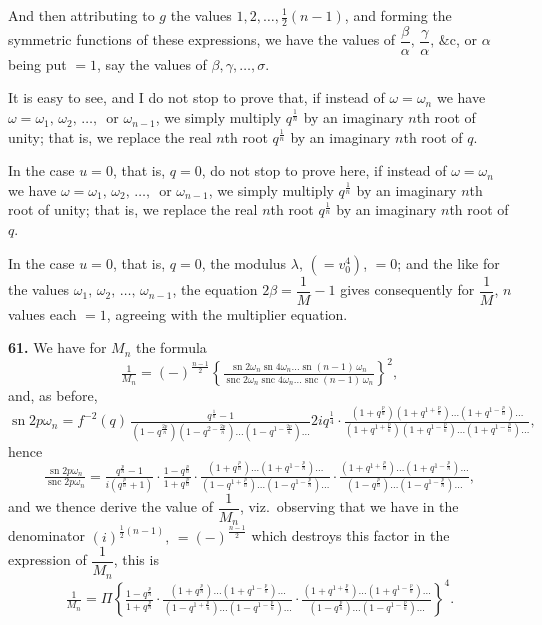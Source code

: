\documentclass[11pt]{article}
\begin{document}
And then attributing to $g$ the values $1, 2, \ldots, \tfrac{1}{2}(n-1)$, and forming the symmetric
functions of these expressions, we have the values of $\dfrac{\beta}{\alpha},\,\dfrac{\gamma}{\alpha},\,\&\text{c}$, or $\alpha$ being put $=1$,
say the values of $\beta,\gamma,\ldots,\sigma$.

It is easy to see, and I do not stop to prove that, if instead of $\omega=\omega_n$ we have
$\omega=\omega_1,\,\omega_2,\,\ldots,\,$ or $\omega_{n-1}$, we simply multiply $q^{\frac{1}{n}}$ by an imaginary $n$th root of unity; that is,
we replace the real $n$th root $q^{\frac{1}{n}}$ by an imaginary $n$th root of $q$.

In the case $u=0$, that is, $q=0$, do not stop to prove here, if instead of $\omega=\omega_n$ we have
$\omega=\omega_1,\,\omega_2,\,\ldots,\,$ or $\omega_{n-1}$, we simply multiply $q^{\frac{1}{n}}$ by an imaginary $n$th root of unity; that is,
we replace the real $n$th root $q^{\frac{1}{n}}$ by an imaginary $n$th root of $q$.

In the case $u=0$, that is, $q=0$, the modulus $\lambda,\,(=v_0^4)$, $=0$; and the
like for the values $\omega_1,\,\omega_2,\,\ldots,\,\omega_{n-1}$, the equation $2\beta=\dfrac{1}{M}-1$ gives consequently for $\dfrac{1}{M}$, $n$
values each $=1$, agreeing with the multiplier equation.

\medskip
\noindent\textbf{61.} We have for $M_n$ the formula
\[
\tfrac{1}{M_n}=(-)^{\frac{n-1}{2}}\!\left\{\tfrac{\operatorname{sn}2\omega_n\operatorname{sn}4\omega_n\ldots\operatorname{sn}(n-1)\,\omega_n}{\operatorname{snc}2\omega_n\operatorname{snc}4\omega_n\ldots\operatorname{snc}(n-1)\,\omega_n}\right\}^{\!2}\!,
\]
and, as before,
\[
\operatorname{sn}2p\omega_n=f^{-2}(q)\,\tfrac{q^{\frac{1}{n}}-1}{(1-q^{\frac{2p}{n}})(1-q^{2-\frac{2p}{n}})\ldots(1-q^{1-\frac{2p}{n}})\ldots}{2iq^{\frac{1}{4}}}\!\cdot\!\tfrac{(1+q^{\frac{p}{n}})(1+q^{1+\frac{p}{n}})\ldots(1+q^{1-\frac{p}{n}})\ldots}{(1+q^{1+\frac{p}{n}})(1+q^{1-\frac{p}{n}})\ldots(1+q^{1-\frac{p}{n}})\ldots},
\]
hence
\[
\tfrac{\operatorname{sn}2p\omega_n}{\operatorname{snc}2p\omega_n}=\tfrac{q^{\frac{p}{n}}-1}{i(q^{\frac{p}{n}}+1)}\!\cdot\!\tfrac{1-q^{\frac{p}{n}}}{1+q^{\frac{p}{n}}}\!\cdot\!\tfrac{(1+q^{\frac{p}{n}})\ldots(1+q^{1-\frac{p}{n}})\ldots}{(1-q^{1+\frac{p}{n}})\ldots(1-q^{1-\frac{p}{n}})\ldots}\!\cdot\!\tfrac{(1+q^{1+\frac{p}{n}})\ldots(1+q^{1-\frac{p}{n}})\ldots}{(1-q^{\frac{p}{n}})\ldots(1-q^{1-\frac{p}{n}})\ldots},
\]
and we thence derive the value of $\dfrac{1}{M_n}$, viz.\ observing that we have in the denominator
$(i)^{\frac{1}{2}(n-1)},\,=(-)^{\frac{n-1}{2}}$ which destroys this factor in the expression of $\dfrac{1}{M_n}$, this is
\[
\tfrac{1}{M_n}=\Pi\!\left\{\tfrac{1-q^{\frac{p}{n}}}{1+q^{\frac{p}{n}}}\!\cdot\!\tfrac{(1+q^{\frac{p}{n}})\ldots(1+q^{1-\frac{p}{n}})\ldots}{(1-q^{1+\frac{p}{n}})\ldots(1-q^{1-\frac{p}{n}})\ldots}\!\cdot\!\tfrac{(1+q^{1+\frac{p}{n}})\ldots(1+q^{1-\frac{p}{n}})\ldots}{(1-q^{\frac{p}{n}})\ldots(1-q^{1-\frac{p}{n}})\ldots}\right\}^{\!4}\!.
\]
\end{document}
